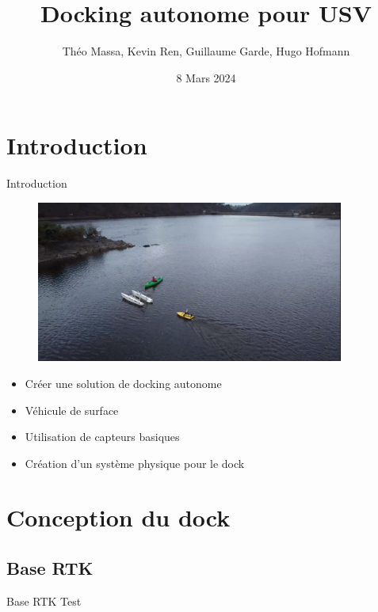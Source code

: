 \documentclass[pdftex,beamer,aspectratio=169]{beamer}
\title[Docking]{Docking autonome pour USV}
\author[]{Théo Massa, Kevin Ren, Guillaume Garde, Hugo Hofmann}
\date{8 Mars 2024}
\institute{ENSTA Bretagne - Lab STICC - Université Bretagne Sud}
\theoremstyle{definition}
\theoremstyle{example}
\theoremstyle{plain}
\begin{document}
\frame{\titlepage}

\begin{frame}[allowframebreaks]
  \tableofcontents
\end{frame}

\section{Introduction} 
\begin{frame}{Introduction}
  \begin{minipage}{0.6\textwidth}
    \begin{figure}
      \centering
      \includegraphics[width=0.9\textwidth]{img_lac.png}
    \end{figure}
  \end{minipage}\hfill
  \begin{minipage}{0.39\textwidth}
    \begin{itemize}
      \item Créer une solution de docking autonome
      \item Véhicule de surface
      \item Utilisation de capteurs basiques
      \item Création d'un système physique pour le dock
    \end{itemize}
  \end{minipage}
\end{frame}

\section{Conception du dock}

\subsection{Base RTK}
\begin{frame}[fragile]{Base RTK}
  Test
\end{frame}
\end{document}
